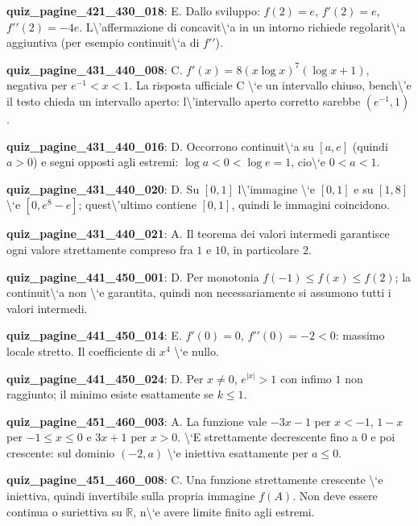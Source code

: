 \documentclass[11pt,a4paper]{article}
\newcounter{quiz}
\begin{document}
\noindent\textbf{quiz\_pagine\_421\_430\_018}: E. Dallo sviluppo: $f(2)=e$, $f\prime(2)=e$, $f\prime\prime(2)=-4e$. L\textbackslash{}'affermazione di concavit\textbackslash{}`a in un intorno richiede regolarit\textbackslash{}`a aggiuntiva (per esempio continuit\textbackslash{}`a di $f\prime\prime$).\par\medskip
\noindent\textbf{quiz\_pagine\_431\_440\_008}: C. $f\prime(x)=8(x\log x)^7(\log x+1)$, negativa per $e^{-1}<x<1$. La risposta ufficiale C \textbackslash{}`e un intervallo chiuso, bench\textbackslash{}'e il testo chieda un intervallo aperto: l\textbackslash{}'intervallo aperto corretto sarebbe $(e^{-1},1)$.\par\medskip
\noindent\textbf{quiz\_pagine\_431\_440\_016}: D. Occorrono continuit\textbackslash{}`a su $[a,e]$ (quindi $a>0$) e segni opposti agli estremi: $\log a<0<\log e=1$, cio\textbackslash{}`e $0<a<1$.\par\medskip
\noindent\textbf{quiz\_pagine\_431\_440\_020}: D. Su $[0,1]$ l\textbackslash{}'immagine \textbackslash{}`e $[0,1]$ e su $[1,8]$ \textbackslash{}`e $[0,e^8-e]$; quest\textbackslash{}'ultimo contiene $[0,1]$, quindi le immagini coincidono.\par\medskip
\noindent\textbf{quiz\_pagine\_431\_440\_021}: A. Il teorema dei valori intermedi garantisce ogni valore strettamente compreso fra $1$ e $10$, in particolare $2$.\par\medskip
\noindent\textbf{quiz\_pagine\_441\_450\_001}: D. Per monotonia $f(-1)\le f(x)\le f(2)$; la continuit\textbackslash{}`a non \textbackslash{}`e garantita, quindi non necessariamente si assumono tutti i valori intermedi.\par\medskip
\noindent\textbf{quiz\_pagine\_441\_450\_014}: E. $f\prime(0)=0$, $f\prime\prime(0)=-2<0$: massimo locale stretto. Il coefficiente di $x^4$ \textbackslash{}`e nullo.\par\medskip
\noindent\textbf{quiz\_pagine\_441\_450\_024}: D. Per $x\ne0$, $e^{|x|}>1$ con infimo $1$ non raggiunto; il minimo esiste esattamente se $k\le1$.\par\medskip
\noindent\textbf{quiz\_pagine\_451\_460\_003}: A. La funzione vale $-3x-1$ per $x<-1$, $1-x$ per $-1\le x\le0$ e $3x+1$ per $x>0$. \textbackslash{}`E strettamente decrescente fino a $0$ e poi crescente: sul dominio $(-2,a)$ \textbackslash{}`e iniettiva esattamente per $a\le0$.\par\medskip
\noindent\textbf{quiz\_pagine\_451\_460\_008}: C. Una funzione strettamente crescente \textbackslash{}`e iniettiva, quindi invertibile sulla propria immagine $f(A)$. Non deve essere continua o suriettiva su $\mathbb R$, n\textbackslash{}`e avere limite finito agli estremi.\par\medskip
\end{document}
